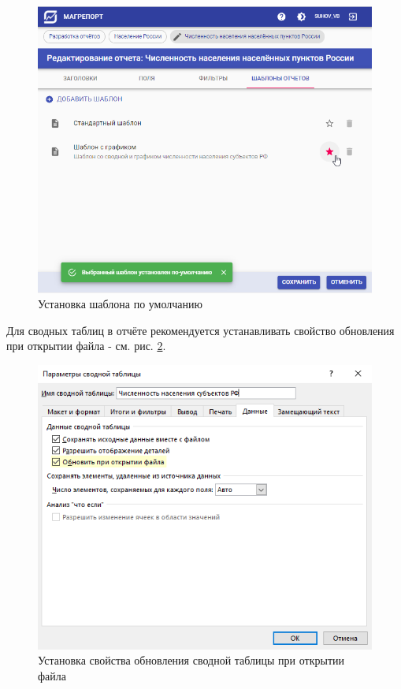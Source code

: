 \documentclass[../user-manual.tex]{subfiles}
\begin{document}
	\begin{figure}[h]
		\centering
		\includegraphics[width=\graphicswidth]{img/16-set-default-template.png}
		\caption{Установка шаблона по умолчанию}
		\label{fig:set-default-template}
	\end{figure}

	\begin{devnote}
		Для сводных таблиц в отчёте рекомендуется устанавливать свойство обновления при открытии файла - см. рис. \ref{fig:excel-pivot-options}.
	\end{devnote}

	\begin{figure}[h]
		\centering
		\includegraphics[width=\graphicswidth]{img/13-excel-pivot-options.png}
		\caption{Установка свойства обновления сводной таблицы при открытии файла}
		\label{fig:excel-pivot-options}
	\end{figure}	
\end{document}

